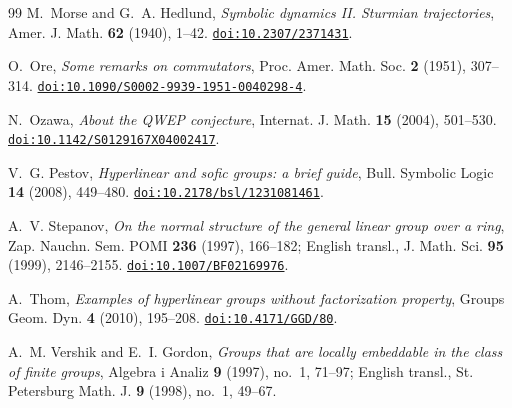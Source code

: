 \documentclass[11pt]{amsart}
\newcommand{\doi}[1]{\href{https://doi.org/#1}{\nolinkurl{doi:#1}}}
\begin{document}
\begin{thebibliography}{99}
M.~Morse and G.~A. Hedlund,
\emph{Symbolic dynamics II. Sturmian trajectories},
Amer. J. Math. \textbf{62} (1940), 1--42.
\doi{10.2307/2371431}.

O.~Ore, \emph{Some remarks on commutators},
Proc. Amer. Math. Soc. \textbf{2} (1951), 307--314.
\doi{10.1090/S0002-9939-1951-0040298-4}.

N.~Ozawa, \emph{About the QWEP conjecture},
Internat. J. Math. \textbf{15} (2004), 501--530.
\doi{10.1142/S0129167X04002417}.

V.~G. Pestov, \emph{Hyperlinear and sofic groups: a brief guide},
Bull. Symbolic Logic \textbf{14} (2008), 449--480.
\doi{10.2178/bsl/1231081461}.

A.~V. Stepanov, \emph{On the normal structure of the general linear
group over a ring}, Zap. Nauchn. Sem. POMI \textbf{236} (1997), 166--182;
English transl., J. Math. Sci. \textbf{95} (1999), 2146--2155.
\doi{10.1007/BF02169976}.

A.~Thom, \emph{Examples of hyperlinear groups without factorization
property}, Groups Geom. Dyn. \textbf{4} (2010), 195--208.
\doi{10.4171/GGD/80}.

A.~M. Vershik and E.~I. Gordon,
\emph{Groups that are locally embeddable in the class of finite groups},
Algebra i Analiz \textbf{9} (1997), no.~1, 71--97; English transl.,
St. Petersburg Math. J. \textbf{9} (1998), no.~1, 49--67.

\end{thebibliography}
\end{document}
